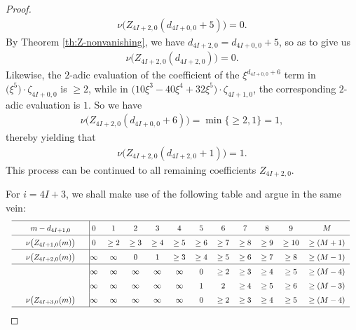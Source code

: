 \documentclass[12pt,reqno]{amsart}
\numberwithin{equation}{section}
\theoremstyle{theorem}
\theoremstyle{definition}
\begin{document}
\begin{proof}
	\begin{align*}
		\nu\big(Z_{4I+2,0}(d_{4I+0,0}+5)\big) = 0.
	\end{align*}
	By Theorem \ref{th:Z-nonvanishing}, we have $d_{4I+2,0} = d_{4I+0,0}+5$, so as to give us
	\begin{align*}
		\nu\big(Z_{4I+2,0}(d_{4I+2,0})\big) = 0.
	\end{align*}
	Likewise, the $2$-adic evaluation of the coefficient of the $\xi^{d_{4I+0,0}+6}$ term in $\big(\xi^5\big)\cdot \zeta_{4I+0,0}$ is $\ge 2$, while in $\big(10 \xi^3 - 40 \xi^4 + 32 \xi^5\big)\cdot \zeta_{4I+1,0}$, the corresponding $2$-adic evaluation is $1$. So we have
	\begin{align*}
		\nu\big(Z_{4I+2,0}(d_{4I+0,0}+6)\big) = \min\{\ge 2,1\} = 1,
	\end{align*}
	thereby yielding that
	\begin{align*}
		\nu\big(Z_{4I+2,0}(d_{4I+2,0}+1)\big) = 1.
	\end{align*}
	This process can be continued to all remaining coefficients $Z_{4I+2,0}$.
	
	For $i=4I+3$, we shall make use of the following table and argue in the same vein:
	\begin{align*}
		\renewcommand\arraystretch{1.5}
		\scalebox{0.8}{%
			\begin{tabular*}{1.25\textwidth}{p{0pt}cp{0pt}|@{\extracolsep{\fill}}ccccccccccc}
				\hline
				& $m-d_{4I+1,0}$ && $0$ & $1$ & $2$ & $3$ & $4$ & $5$ & $6$ & $7$ & $8$ & $9$ & $M$\\
				\hline
				& $\nu\big(Z_{4I+1,0}(m)\big)$ && $0$ & $\ge 2$ & $\ge 3$ & $\ge 4$ & $\ge 5$ & $\ge 6$ & $\ge 7$ & $\ge 8$ & $\ge 9$ & $\ge 10$ & $\ge (M+1)$\\
				\hline
				& $\nu\big(Z_{4I+2,0}(m)\big)$ && $\infty$ & $\infty$ & $0$ & $1$ & $\ge 3$ & $\ge 4$ & $\ge 5$ & $\ge 6$ & $\ge 7$ & $\ge 8$ & $\ge (M-1)$\\
				\hline
				&  && $\infty$ & $\infty$ & $\infty$ & $\infty$ & $\infty$ & $0$ & $\ge 2$ & $\ge 3$ & $\ge 4$ & $\ge 5$ & $\ge (M-4)$\\
				&  && $\infty$ & $\infty$ & $\infty$ & $\infty$ & $\infty$ & $1$ & $2$ & $\ge 4$ & $\ge 5$ & $\ge 6$ & $\ge (M-3)$\\
				& $\nu\big(Z_{4I+3,0}(m)\big)$ && $\infty$ & $\infty$ & $\infty$ & $\infty$ & $\infty$ & $0$ & $\ge 2$ & $\ge 3$ & $\ge 4$ & $\ge 5$ & $\ge (M-4)$\\
				\hline
			\end{tabular*}
		}
	\end{align*}


\end{proof}
\end{document}
